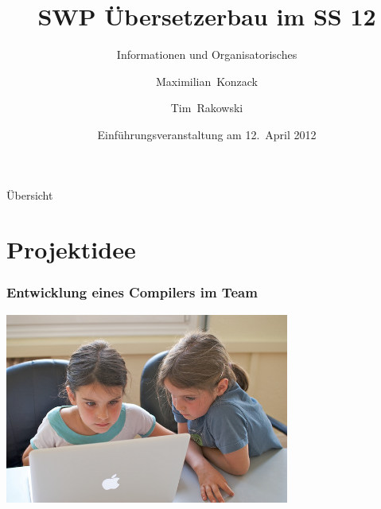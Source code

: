 \documentclass[ucs,9pt]{beamer}
\title{SWP Übersetzerbau im SS 12}
\subtitle{Informationen und Organisatorisches}
\author{Maximilian~Konzack \and Tim~Rakowski}
\institute[FU Berlin]{Freie Universität Berlin}
\date{Einführungsveranstaltung am 12.~April 2012}
\begin{document}
\begin{frame}[plain]
  \titlepage
\end{frame}

\begin{frame}{Übersicht}
  \tableofcontents
\end{frame}

\section{Projektidee}
\begin{frame}
  \frametitle{Entwicklung eines Compilers im Team}
  \begin{center}
    \includegraphics[width=0.7\textwidth]{pair_prog}
  \end{center}
\end{frame}
\end{document}
